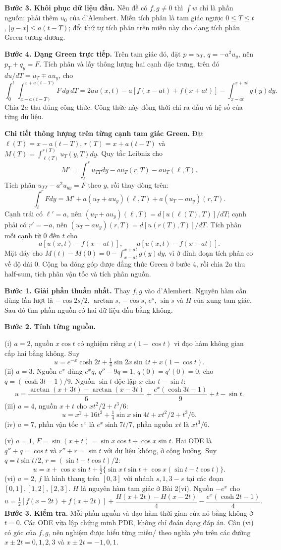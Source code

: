 \textbf{Bước 3. Khôi phục dữ liệu đầu.} Nếu đề có $f,g\ne0$ thì $\int w$ chỉ là phần nguồn; phải thêm $u_0$ của d'Alembert. Miền tích phân là tam giác ngược $0\le T\le t$, $|y-x|\le a(t-T)$; đổi thứ tự tích phân trên miền này cho dạng tích phân Green tương đương.

\textbf{Bước 4. Dạng Green trực tiếp.} Trên tam giác đó, đặt $p=u_T$, $q=-a^2u_y$, nên $p_T+q_y=F$. Tích phân và lấy thông lượng hai cạnh đặc trưng, trên đó $du/dT=u_T\mp au_y$, cho
\[\int_0^t\int_{x-a(t-T)}^{x+a(t-T)}F\,dy\,dT
=2au(x,t)-a[f(x-at)+f(x+at)]-\int_{x-at}^{x+at}g(y)dy.\]
Chia $2a$ thu đúng công thức. Công thức này đồng thời chỉ ra dấu và hệ số của từng dữ liệu.

\textbf{Chi tiết thông lượng trên từng cạnh tam giác Green.} Đặt $\ell(T)=x-a(t-T)$, $r(T)=x+a(t-T)$ và $M(T)=\int_{\ell(T)}^{r(T)}u_T(y,T)dy$. Quy tắc Leibniz cho
\[M'=\int_\ell^r u_{TT}dy-a u_T(r,T)-a u_T(\ell,T).\]
Tích phân $u_{TT}-a^2u_{yy}=F$ theo $y$, rồi thay dòng trên:
\[\int_\ell^r Fdy=M'+a(u_T+a u_y)(\ell,T)+a(u_T-a u_y)(r,T).\]
Cạnh trái có $\ell'=a$, nên $(u_T+a u_y)(\ell,T)=d[u(\ell(T),T)]/dT$; cạnh phải có $r'=-a$, nên $(u_T-a u_y)(r,T)=d[u(r(T),T)]/dT$. Tích phân mỗi cạnh từ $0$ đến $t$ cho
\[a[u(x,t)-f(x-at)],\qquad a[u(x,t)-f(x+at)].\]
Mặt đáy cho $M(t)-M(0)=0-\int_{x-at}^{x+at}g(y)dy$, vì ở đỉnh đoạn tích phân co về độ dài $0$. Cộng ba đóng góp được đẳng thức Green ở bước 4, rồi chia $2a$ thu half-sum, tích phân vận tốc và tích phân nguồn.

\textbf{Bước 1. Giải phần thuần nhất.} Thay $f,g$ vào d'Alembert. Nguyên hàm cần dùng lần lượt là $-\cos2s/2$, $\arctan s$, $-\cos s$, $e^s$, $\sin s$ và $H$ của xung tam giác. Sau đó tìm phần nguồn có hai dữ liệu đầu bằng không.

\textbf{Bước 2. Tính từng nguồn.}

(i) $a=2$, nguồn $x\cos t$ có nghiệm riêng $x(1-\cos t)$ vì đạo hàm không gian cấp hai bằng không. Suy
\[u=e^{-x}\cosh2t+\tfrac14\sin2x\sin4t+x(1-\cos t).\]
(ii) $a=3$. Nguồn $e^x$ dùng $e^xq$, $q''-9q=1$, $q(0)=q'(0)=0$, cho $q=(\cosh3t-1)/9$. Nguồn $\sin t$ độc lập $x$ cho $t-\sin t$:
\[u=\frac{\arctan(x+3t)-\arctan(x-3t)}6+\frac{e^x(\cosh3t-1)}9+t-\sin t.\]
(iii) $a=4$, nguồn $x+t$ cho $xt^2/2+t^3/6$:
\[u=x^2+16t^2+\tfrac14\sin x\sin4t+xt^2/2+t^3/6.\]
(iv) $a=7$, phần vận tốc $e^x$ là $e^x\sinh7t/7$, phần nguồn $xt$ là $xt^3/6$.

(v) $a=1$, $F=\sin(x+t)=\sin x\cos t+\cos x\sin t$. Hai ODE là $q''+q=\cos t$ và $r''+r=\sin t$ với dữ liệu không, ở cộng hưởng. Suy $q=t\sin t/2$, $r=(\sin t-t\cos t)/2$:
\[u=x+\cos x\sin t+\tfrac12\{\sin x\,t\sin t+\cos x(\sin t-t\cos t)\}.\]
(vi) $a=2$, $f$ là hình thang trên $[0,3]$ với nhánh $s,1,3-s$ tại các đoạn $[0,1],[1,2],[2,3]$. $H$ là nguyên hàm tam giác ở Bài 2(vi). Nguồn $-e^x$ cho
\[u=\tfrac12[f(x-2t)+f(x+2t)]+\frac{H(x+2t)-H(x-2t)}4-\frac{e^x(\cosh2t-1)}4.\]
\textbf{Bước 3. Kiểm tra.} Mỗi phần nguồn và đạo hàm thời gian của nó bằng không ở $t=0$. Các ODE vừa lập chứng minh PDE, không chỉ đoán dạng đáp án. Câu (vi) có góc của $f,g$, nên nghiệm được hiểu từng miền/ theo nghĩa yếu trên các đường $x\pm2t=0,1,2,3$ và $x\pm2t=-1,0,1$.

